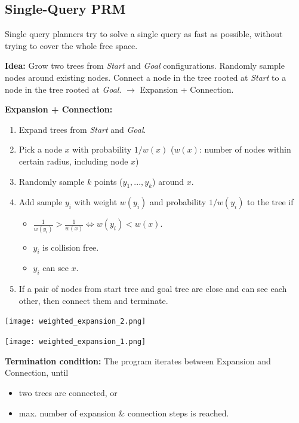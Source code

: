 \begin{multicols*}{2}
\subsection{Single-Query PRM}
Single query planners try to solve a single query as fast as possible, without trying to cover the whole free space.\par

\textbf{Idea:} Grow two trees from \textit{Start} and \textit{Goal} configurations.
Randomly sample nodes around existing nodes.
Connect a node in the tree rooted at \textit{Start} to a node in the tree rooted at \textit{Goal}. $\rightarrow$ Expansion + Connection.\par

\textbf{Expansion + Connection:}
\begin{enumerate}
	\item Expand trees from \textit{Start} and \textit{Goal}.
	\item Pick a node $x$ with probability $1/w(x)$ ($w(x)$: number of nodes within certain radius, including node $x$)
	\item Randomly sample $k$ points ($y_1, ..., y_k$) around $x$.
	\item Add sample $y_i$ with weight $w(y_i)$	and probability $1/w(y_i)$ to the tree if
	\begin{itemize}
		\item $\frac{1}{w(y_i)} > \frac{1}{w(x)} \Leftrightarrow w(y_i) < w(x)$.
		\item $y_i$ is collision free.
		\item $y_i$ can see $x$.
	\end{itemize}
	\item If a pair of nodes from start tree and goal tree are close and can see each other, then connect them and terminate.
\end{enumerate}

\begin{minipage}[t]{.5\columnwidth}
	\raggedright
	\texttt{[image: weighted\_expansion\_2.png]}
\end{minipage}%
\begin{minipage}[t]{.5\columnwidth}
	\raggedleft
	\texttt{[image: weighted\_expansion\_1.png]}
\end{minipage}

\textbf{Termination condition:} The program iterates between Expansion and Connection, until
\begin{itemize}
	\item two trees are connected, or
	\item max. number of expansion \& connection steps is reached.
\end{itemize}


\end{multicols*}
